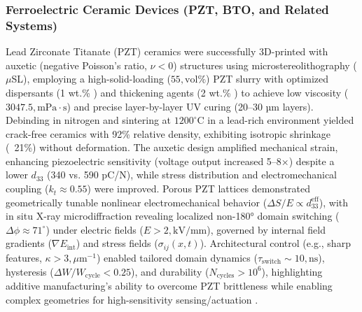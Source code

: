 \documentclass[a4paper,fleqn]{cas-sc}
\begin{document}
\subsubsection*{Ferroelectric Ceramic Devices (PZT, BTO, and Related Systems)}
\par Lead Zirconate Titanate (PZT) ceramics were successfully 3D-printed with auxetic (negative Poisson’s ratio, $\nu < 0$) structures using microstereolithography ($\mu$SL), employing a high-solid-loading ($55,\text{vol}\%$) PZT slurry with optimized dispersants (1 wt.\% ) and thickening agents (2 wt.\% ) to achieve low viscosity ($3047.5,\text{mPa} \cdot \text{s}$) and precise layer-by-layer UV curing (20–30 µm layers). Debinding in nitrogen and sintering at $1200 ^\circ\text{C}$ in a lead-rich environment yielded crack-free ceramics with 92\% relative density, exhibiting isotropic shrinkage (~21\%) without deformation. The auxetic design amplified mechanical strain, enhancing piezoelectric sensitivity (voltage output increased 5–8×) despite a lower $d_{33}$ (340 vs. 590 pC/N), while stress distribution and electromechanical coupling ($k_t \approx 0.55$) were improved. Porous PZT lattices demonstrated geometrically tunable nonlinear electromechanical behavior ($\Delta S/E \propto d_{33}^\text{eff}$), with in situ X-ray microdiffraction revealing localized non-180° domain switching ($\Delta\phi \approx 71^\circ$) under electric fields ($E > 2,\text{kV/mm}$), governed by internal field gradients ($\nabla E_\text{int}$) and stress fields ($\sigma_{ij}(x,t)$). Architectural control (e.g., sharp features, $\kappa > 3,\mu\text{m}^{-1}$) enabled tailored domain dynamics ($\tau_\text{switch} \sim 10,\text{ns}$), hysteresis ($\Delta W/W_\text{cycle} < 0.25$), and durability ($N_\text{cycles} > 10^6$), highlighting additive manufacturing’s ability to overcome PZT brittleness while enabling complex geometries for high-sensitivity sensing/actuation \cite{wei20253d,jiao2024development,pramanick2025nonlinearity}.
\end{document}
